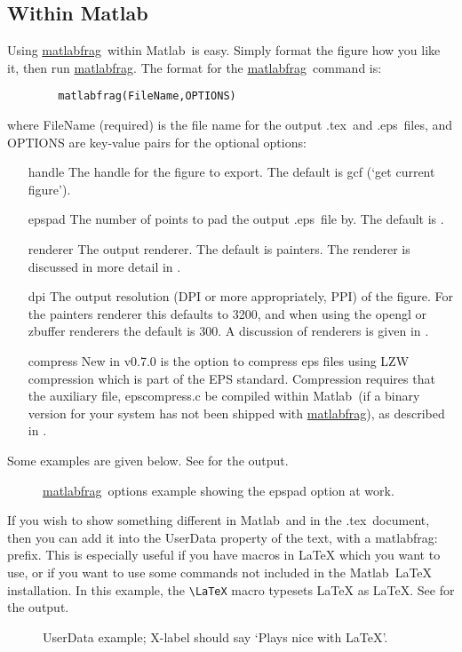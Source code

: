 \documentclass[a4paper,11pt]{article}
\newcommand\matlabfrag{\texorpdfstring{\href{http://www.mathworks.com/matlabcentral/fileexchange/21286}{{\ttfamily matlabfrag}}}{matlabfrag}}
\newcommand\matlab{\texorpdfstring{{\sc Matlab}}{Matlab}}
\newcommand\tex{\texorpdfstring{{\sc .tex}}{.tex}}
\newcommand\eps{\texorpdfstring{{\sc .eps}}{.eps}}
\def\'#1'{{\ttfamily \textquotesingle #1\textquotesingle}}
\begin{document}
	\subsection{Within \matlab}%
	Using \matlabfrag\ within \matlab\ is easy. Simply format the figure how you like it, then run
	\matlabfrag. The format for the \matlabfrag\ command is:
	\begin{verbatim}
		matlabfrag(FileName,OPTIONS)
	\end{verbatim}
	where {\ttfamily FileName} (required) is the file name for the output \tex\ and \eps\ files, and 
	{\ttfamily OPTIONS} are key-value pairs for the optional options:
	\begin{itemize}
		\item[{\'handle'}] The handle for the figure to export. The default is {\ttfamily gcf} (`get 
		current figure').
		\item[{\'epspad'}] The number of points to pad the output \eps\ file by. The default is {\ttfamily [0,0,0,0]}.
		\item[{\'renderer'}] The output renderer. The default is {\ttfamily painters}. The renderer is
		discussed in more detail in .
		\item[{\'dpi'}] The output resolution (DPI or more appropriately, PPI) of the figure.
		For the {\ttfamily painters} renderer this defaults to 3200, and when
		using the {\ttfamily opengl} or {\ttfamily zbuffer} renderers the default is 300.
		A discussion of renderers is given in .
		\item[{\'compress'}] New in v0.7.0 is the option to compress eps files using LZW compression which is part of the EPS standard.
		Compression requires that the auxiliary file, {\ttfamily epscompress.c} be compiled within \matlab\ (if a binary version for your system has not been shipped with \matlabfrag), as described in .
	\end{itemize}
	Some examples are given below.\nobreak
	See  for the output.
	\begin{figure}[ht]
		\centering
		\quad
		\caption{\matlabfrag\ options example showing the {\ttfamily epspad} option at work.}
	\end{figure}
	
	If you wish to show something different in \matlab\ and in the \tex\ document, then you
	can add it into the {\ttfamily UserData} property of the text, with a {\ttfamily matlabfrag:} prefix. This is
	especially useful if you have macros in LaTeX which you want to use, or if you want to use some
	commands not included in the \matlab\ LaTeX installation. In this example, the \verb|\LaTeX| macro
	typesets LaTeX as \LaTeX.
	See  for the output.
	\begin{figure}[ht]
		\centering
		\caption{UserData example; X-label should say `Plays nice with \LaTeX'.}
	\end{figure}
	
\end{document}
